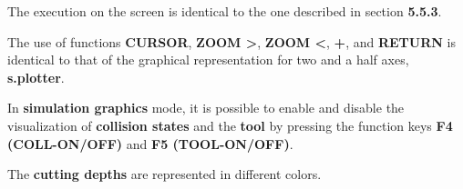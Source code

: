 \begin{itemize}
\end{itemize}

\vspace{.5cm}

The execution on the screen is identical to the one described in section \textbf{5.5.3}.

The use of functions \textbf{CURSOR}, \textbf{ZOOM >}, \textbf{ZOOM <}, \textbf{+}, and \textbf{RETURN} is identical to that of the graphical representation for two and a half axes, \textbf{s.plotter}.

\notes

In \textbf{simulation graphics} mode, it is possible to enable and disable the visualization of \textbf{collision states} and the \textbf{tool} by pressing the function keys \textbf{F4 (COLL-ON/OFF)} and \textbf{F5 (TOOL-ON/OFF)}.

The \textbf{cutting depths} are represented in different colors.